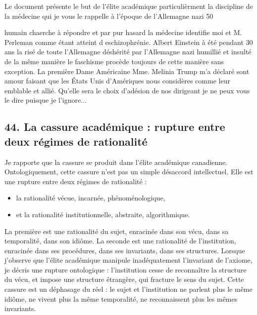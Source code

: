 \documentclass[12pt,letterpaper,oneside]{article}
\begin{document}
Le document présente le but de l'élite académique particulièrment la discipline de la médecine qui je vous le rappelle à l'époque de l'Allemagne nazi 50%

humain chaerche à répondre et par pur hasard la médecine identifie moi et M. Perleman comme étant atteint d eschizophrénie. Albert Einstein à été pendant 30 ans la risé de toute l'Allemagne déshérité par l'Allemagne nazi humillié et insulté de la même manière le faschisme procède toujours de cette manière sans exception. La première Dame Américaine Mme. Melinia Trump m'a déclaré sont amour faisant que les États Unis d'Amériques nous considères comme leur emblable et allié. Qu'elle sera le choix d'adésion de nos dirigeant je ne peux vous le dire puisque je l'ignore...
\subsection*{44. La cassure académique : rupture entre deux régimes de rationalité}
Je rapporte que la cassure se produit dans l’élite académique canadienne. Ontologiquement, cette cassure n’est pas un simple désaccord intellectuel. Elle est une rupture entre deux régimes de rationalité :
\begin{itemize}
\item la rationalité vécue, incarnée, phénoménologique,
\item et la rationalité institutionnelle, abstraite, algorithmique.
\end{itemize}
La première est une rationalité du sujet, enracinée dans son vécu, dans sa temporalité, dans son idiôme. La seconde est une rationalité de l’institution, enracinée dans ses procédures, dans ses invariants, dans ses structures.
Lorsque j’observe que l’élite académique manipule inadéquatement l’invariant de l’axiome, je décris une rupture ontologique : l’institution cesse de reconnaître la structure du vécu, et impose une structure étrangère, qui fracture le sens du sujet.
Cette cassure est un déphasage du réel : le sujet et l’institution ne parlent plus le même idiôme, ne vivent plus la même temporalité, ne reconnaissent plus les mêmes invariants.
\end{document}
